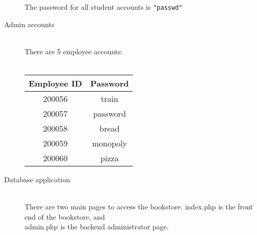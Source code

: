 \documentclass{article}
\begin{document}
\begin{description}
		The password for all student accounts is \texttt{"passwd"}
	
	\item[Admin accounts] \hfill \\
		There are 5 employee accounts: \hfill \\\\
\begin{tabular}{|c|c|}
  \hline
  Employee ID & Password \\
  \hline \hline
  200056 & train \\
  \hline
  200057 & password \\
  \hline
  200058 & bread \\
  \hline
  200059 & monopoly \\
  \hline
  200060 & pizza \\
  \hline
\end{tabular}


	\item[Database application] \hfill \\
	There are two main pages to access the bookstore.  
	index.php is the front end of the bookstore, and \hfill \\
	admin.php is the backend administrator page.

\end{description}
\end{document}
